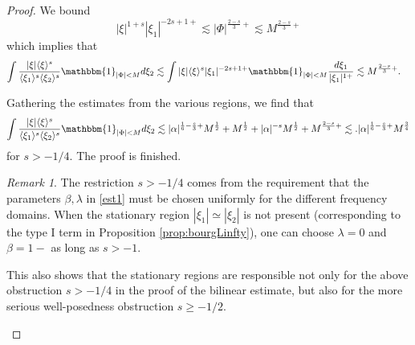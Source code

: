 \documentclass[%
11pt,  reqno]{amsart}
\newcommand{\fia}{\mathbbm{1}_{|\Phi-\alpha|<M}}
\newcommand{\jap}[1]{\langle #1 \rangle}
\newcommand{\5}{\textup{V}}
\newcommand{\noi}{\noindent}
\newcommand{\les}{\lesssim}
\theoremstyle{remark}
\newtheorem{remark}[theorem]{Remark}
\newcommand{\bul}{\bullet}
\newcommand{\ges}{\gtrsim}
\numberwithin{equation}{section}
\numberwithin{theorem}{section}
\begin{document}
\begin{proof}
We bound
\begin{equation}\label{eq:estbm1}
    |\xi|^{1+s}|\xi_1|^{-2s+1+}\lesssim |\Phi|^{\frac{2-s}{3}+}\lesssim M^{\frac{2-s}{3}+}
\end{equation}
which implies that
\begin{align}
\int \frac{|\xi|\jap{\xi}^s}{\jap{\xi_1}^s\jap{\xi_2}^s}\mathbbm{1}_{|\Phi|<M} d\xi_2 &\les \int |\xi|\jap{\xi}^s|\xi_1|^{-2s+1+}\mathbbm{1}_{|\Phi|<M}\frac{d\xi_1}{|\xi_1|^{1+}}\lesssim  M^{\frac{2-s}{3}+}.
\end{align}

\medskip

Gathering the estimates from the various regions, we find that
\begin{align}
\int \frac{|\xi|\jap{\xi}^s}{\jap{\xi_1}^s\jap{\xi_2}^s}\mathbbm{1}_{|\Phi|<M} d\xi_2 \lesssim |\alpha|^{\frac16-\frac s3+}M^{\frac12} + M^{\frac12} + |\alpha|^{-s}M^{\frac12} +  M^{\frac{2-s}{3}+} \lesssim .|\alpha|^{\frac16-\frac s3+}M^{\frac34}
\end{align}
for $s>-1/4$. The proof is finished.

\begin{remark}
    The restriction $s>-1/4$ comes from the requirement that the parameters $\beta,\lambda$ in \eqref{est1} must be chosen uniformly for the different frequency domains. When the stationary region $|\xi_1|\simeq |\xi_2|$ is not present (corresponding to the type I term in Proposition \ref{prop:bourgLinfty}), one can choose $\lambda=0$ and $\beta=1-$ as long as $s>-1$.

    This also shows that the stationary regions are responsible not only for the above obstruction $s>-1/4$ in the proof of the bilinear estimate, but also for the more serious well-posedness obstruction $s\ge -1/2$.

\end{remark}





\end{proof}
\end{document}
